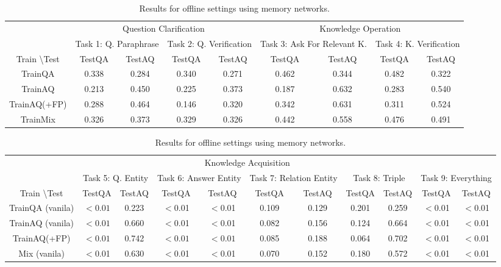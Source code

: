 \begin{table}[h]
\centering
\scriptsize
\begin{tabular}{ccccccccc}\toprule
&\multicolumn{4}{c}{Question Clarification }&\multicolumn{4}{c}{Knowledge Operation} \\\cmidrule(r){2-5}\cmidrule(r){6-9}
&\multicolumn{2}{c}{Task 1: Q. Paraphrase}&\multicolumn{2}{c}{Task 2: Q. Verification}&\multicolumn{2}{c}{Task 3: Ask For Relevant K.}&\multicolumn{2}{c}{Task 4: K. Verification}  \\\cmidrule(r){2-9}
Train \textbackslash Test &TestQA&TestAQ &TestQA&TestAQ &TestQA&TestAQ &TestQA&TestAQ\\\midrule
TrainQA &0.338 &0.284 &0.340&0.271&  0.462&0.344 &  0.482&0.322\\
TrainAQ&0.213&0.450&0.225&0.373&0.187&0.632  &0.283&0.540 \\
TrainAQ(+FP)&0.288&0.464&0.146&0.320&0.342&0.631&0.311&0.524 \\
TrainMix&0.326&0.373&0.329&0.326&0.442&0.558 & 0.476&0.491 \\\bottomrule
\end{tabular}
\centering
\scriptsize
\begin{tabular}{ccccccccccc}\toprule
&\multicolumn{8}{c}{Knowledge Acquisition }   \\\cmidrule(r){2-11}
&\multicolumn{2}{c}{Task 5:  Q. Entity}&\multicolumn{2}{c}{Task 6: Answer Entity}   &\multicolumn{2}{c}{Task 7: Relation Entity}&\multicolumn{2}{c}{Task 8: Triple}&\multicolumn{2}{c}{Task 9: Everything}   \\\cmidrule(r){2-3}\cmidrule(r){4-5}\cmidrule(r){6-7}\cmidrule(r){8-9}\cmidrule(r){10-11}
Train \textbackslash Test &TestQA&TestAQ &TestQA&TestAQ &TestQA&TestAQ &TestQA&TestAQ&TestQA&TestAQ \\\midrule
TrainQA (vanila)&$<0.01$ &0.223& $<$0.01&$<$0.01&0.109&0.129& 0.201&0.259 & $<$0.01&$<$0.01\\
TrainAQ (vanila)&$<0.01$ &0.660& $<$0.01&$<$0.01&0.082&0.156&0.124&0.664 & $<$0.01&$<$0.01\\
TrainAQ(+FP)&$<0.01$& 0.742&$<0.01$&$<0.01$& 0.085&0.188&0.064&0.702&$<$0.01&$<$0.01  \\
Mix (vanila)& $<$0.01 &0.630&$<$0.01& $<$0.01 &0.070&0.152&0.180&0.572& $<$0.01&$<$0.01\\\bottomrule
\end{tabular}
\caption{Results for offline settings using memory networks.}
\label{OfflineResult}
\end{table}

